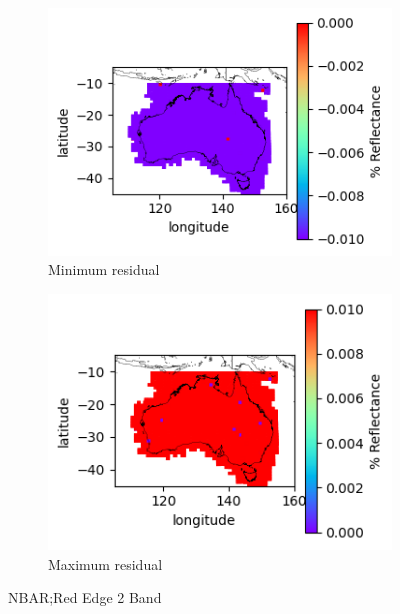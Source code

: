 \documentclass[a4paper]{article}
\begin{document}
      \begin{figure}[h!]
        \centering
          \begin{subfigure}[l]{.4\linewidth}
            \hspace{-32mm}
            \includegraphics[scale=0.9]{plots/nbar/nbar_red_edge_2-MinResidual.png}
            \caption{Minimum residual}
          \end{subfigure}
%
          \begin{subfigure}[r]{.4\linewidth}
            \includegraphics[scale=0.9]{plots/nbar/nbar_red_edge_2-MaxResidual.png}
            \caption{Maximum residual}
          \end{subfigure}
        \caption{NBAR;\@ Red Edge 2 Band}\label{figure:12}
      \end{figure}

  \clearpage
\end{document}
